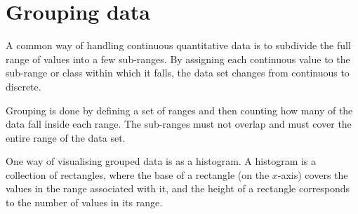\section{Grouping data}
\label{sec:statistics_grouping_data}
A common way of handling continuous quantitative data is to subdivide
the full range of values into a few sub-ranges.
By assigning each continuous value to the sub-range or class within which it
falls, the data set changes from continuous to discrete.\par

Grouping is done by defining a set of ranges and then counting how
many of the data fall inside each range. The sub-ranges must
 not overlap and must cover the entire
range of the data set.\par

One way of visualising grouped data is as a histogram. A histogram is
a collection of rectangles, where the base of a rectangle (on the
$x$-axis) covers the values in the range associated with it, and the
height of a rectangle corresponds to the number of values in its
range.\par

